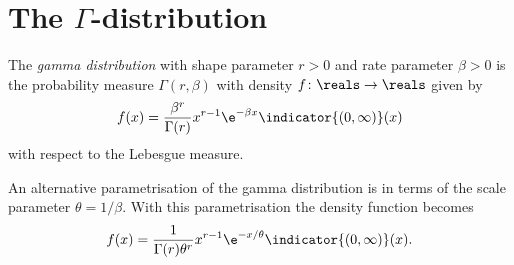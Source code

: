 \documentclass[article, a4paper, 11pt, oneside]{memoir}
\numberwithin{equation}{chapter}
\newcommand{\calF}{\mathcal{F}}
\begin{document}



\section{The $\Gamma$-distribution}

\begin{definition}
    The \emph{gamma distribution} with shape parameter $r > 0$ and rate parameter $\beta > 0$ is the probability measure $\Gamma(r,\beta)$ with density $f \colon \reals \to \reals$ given by
    \begin{equation*}
        f(x)
            = \frac{\beta^r}{\Gamma(r)} x^{r-1} \e^{-\beta x} \indicator{(0,\infty)}(x)
    \end{equation*}
    with respect to the Lebesgue measure.
\end{definition}
%
An alternative parametrisation of the gamma distribution is in terms of the scale parameter $\theta = 1/\beta$. With this parametrisation the density function becomes
%
\begin{equation*}
    f(x)
        = \frac{1}{\Gamma(r)\theta^r} x^{r-1} \e^{-x/\theta} \indicator{(0,\infty)}(x).
\end{equation*}
\end{document}
